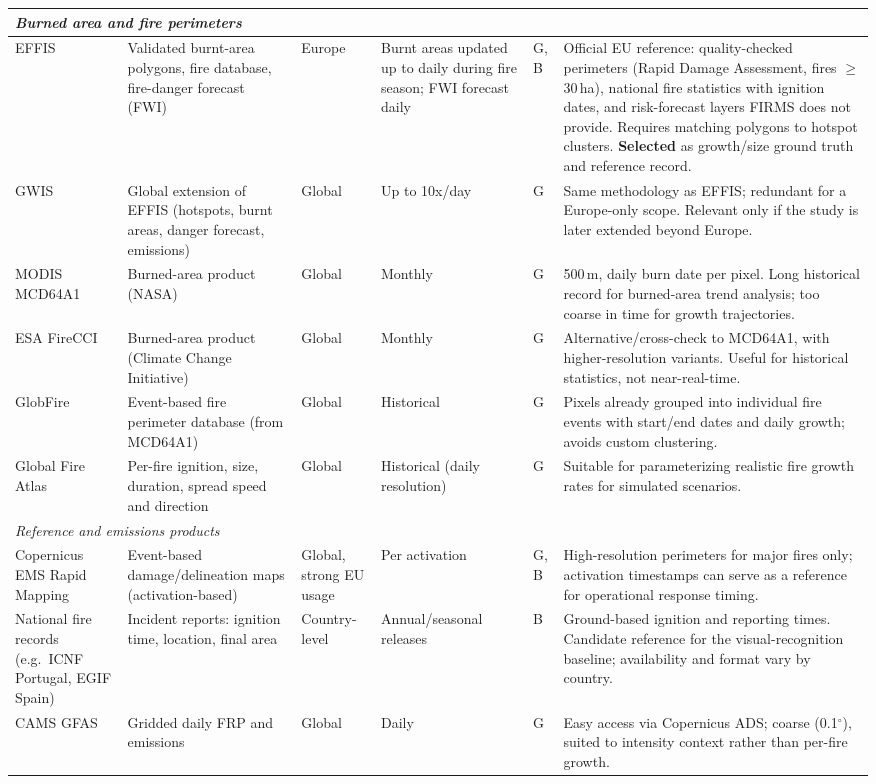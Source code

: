 \documentclass[11pt]{article}
\begin{document}
\begin{longtable}{p{2.2cm}p{2.6cm}p{1.7cm}p{1.8cm}p{1.0cm}p{4.9cm}}
\multicolumn{6}{l}{\textit{Burned area and fire perimeters}} \\
\midrule
EFFIS & Validated burnt-area polygons, fire database, fire-danger forecast (FWI) & Europe & Burnt areas updated up to daily during fire season; FWI forecast daily & G, B & Official EU reference: quality-checked perimeters (Rapid Damage Assessment, fires $\geq$30\,ha), national fire statistics with ignition dates, and risk-forecast layers FIRMS does not provide. Requires matching polygons to hotspot clusters. \textbf{Selected} as growth/size ground truth and reference record. \\
GWIS & Global extension of EFFIS (hotspots, burnt areas, danger forecast, emissions) & Global & Up to 10x/day & G & Same methodology as EFFIS; redundant for a Europe-only scope. Relevant only if the study is later extended beyond Europe. \\
MODIS MCD64A1 & Burned-area product (NASA) & Global & Monthly & G & 500\,m, daily burn date per pixel. Long historical record for burned-area trend analysis; too coarse in time for growth trajectories. \\
ESA FireCCI & Burned-area product (Climate Change Initiative) & Global & Monthly & G & Alternative/cross-check to MCD64A1, with higher-resolution variants. Useful for historical statistics, not near-real-time. \\
GlobFire & Event-based fire perimeter database (from MCD64A1) & Global & Historical & G & Pixels already grouped into individual fire events with start/end dates and daily growth; avoids custom clustering. \\
Global Fire Atlas & Per-fire ignition, size, duration, spread speed and direction & Global & Historical (daily resolution) & G & Suitable for parameterizing realistic fire growth rates for simulated scenarios. \\
\midrule

\multicolumn{6}{l}{\textit{Reference and emissions products}} \\
\midrule
Copernicus EMS Rapid Mapping & Event-based damage/delineation maps (activation-based) & Global, strong EU usage & Per activation & G, B & High-resolution perimeters for major fires only; activation timestamps can serve as a reference for operational response timing. \\
National fire records (e.g.\ ICNF Portugal, EGIF Spain) & Incident reports: ignition time, location, final area & Country-level & Annual/seasonal releases & B & Ground-based ignition and reporting times. Candidate reference for the visual-recognition baseline; availability and format vary by country. \\
CAMS GFAS & Gridded daily FRP and emissions & Global & Daily & G & Easy access via Copernicus ADS; coarse (0.1$^\circ$), suited to intensity context rather than per-fire growth. \\
\bottomrule
\end{longtable}
\end{document}
